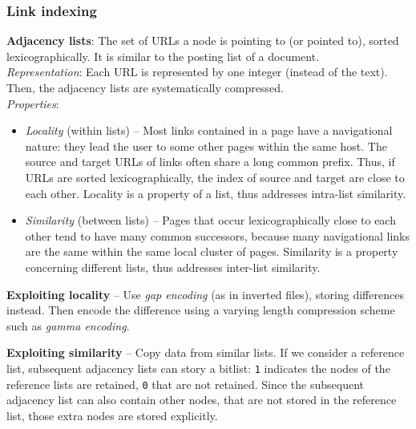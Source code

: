   \subsubsection{Link indexing} %
  \label{ssub:link_indexing}
    \textbf{Adjacency lists}: The set of URLs a node is pointing to (or pointed to), sorted lexicographically. It is similar to the posting list of a document.\\
    \emph{Representation}: Each URL is represented by one integer (instead of the text). Then, the adjacency lists are systematically compressed.\\
    \emph{Properties}:
    \begin{itemize}
      \item \emph{Locality} (within lists) -- Most links contained in a page have a navigational nature: they lead the user to some other pages within the same host. The source and target URLs of links often share a long common prefix. Thus, if URLs are sorted lexicographically, the index of source and target are close to each other. Locality is a property of a list, thus addresses intra-list similarity.
      \item \emph{Similarity} (between lists) --  Pages that occur lexicographically close to each other tend to have many common successors, because many navigational links are the same within the same local cluster of pages. Similarity is a property concerning different lists, thus addresses inter-list similarity.
    \end{itemize}

    \textbf{Exploiting locality} -- Use \emph{gap encoding} (as in inverted files), storing differences instead. Then encode the difference using a varying length compression scheme such as \emph{gamma encoding}.

    \textbf{Exploiting similarity} -- Copy data  from similar lists.  If we consider a reference list, subsequent adjacency lists can story a bitlist: \texttt{1} indicates the nodes of the reference lists are retained, \texttt{0} that are not retained. Since the subsequent adjacency list can also contain other nodes, that are not stored in the reference list, those extra nodes are stored explicitly.

